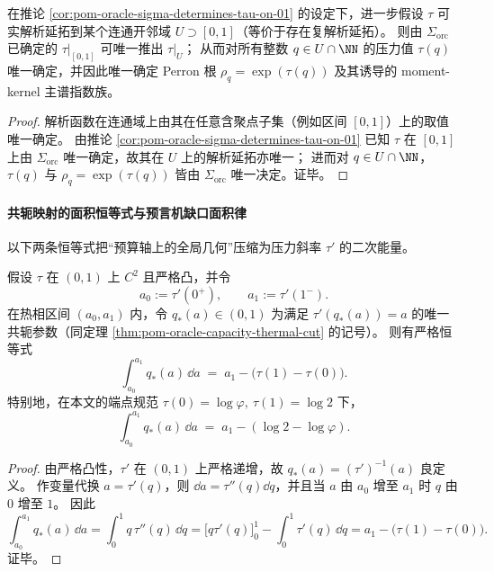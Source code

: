 \begin{corollary}[解析延拓的全谱决定性]\label{cor:pom-oracle-analytic-extension-all-spectrum}
在推论 \ref{cor:pom-oracle-sigma-determines-tau-on-01} 的设定下，进一步假设 \(\tau\) 可实解析延拓到某个连通开邻域 \(U\supset[0,1]\)（等价于存在复解析延拓）。
则由 \(\Sigma_{\mathrm{orc}}\) 已确定的 \(\tau|_{[0,1]}\) 可唯一推出 \(\tau|_{U}\)；
从而对所有整数 \(q\in U\cap\NN\) 的压力值 \(\tau(q)\) 唯一确定，并因此唯一确定 Perron 根 \(\rho_q=\exp(\tau(q))\) 及其诱导的 moment-kernel 主谱指数族。
\end{corollary}
\begin{proof}
解析函数在连通域上由其在任意含聚点子集（例如区间 \([0,1]\)）上的取值唯一确定。
由推论 \ref{cor:pom-oracle-sigma-determines-tau-on-01} 已知 \(\tau\) 在 \([0,1]\) 上由 \(\Sigma_{\mathrm{orc}}\) 唯一确定，故其在 \(U\) 上的解析延拓亦唯一；
进而对 \(q\in U\cap\NN\)，\(\tau(q)\) 与 \(\rho_q=\exp(\tau(q))\) 皆由 \(\Sigma_{\mathrm{orc}}\) 唯一决定。证毕。
\end{proof}

\paragraph{共轭映射的面积恒等式与预言机缺口面积律}
以下两条恒等式把“预算轴上的全局几何”压缩为压力斜率 \(\tau'\) 的二次能量。

\begin{theorem}\label{thm:pom-oracle-qstar-area-identity}
假设 \(\tau\) 在 \((0,1)\) 上 \(C^2\) 且严格凸，并令
\[
a_0:=\tau'(0^+),\qquad a_1:=\tau'(1^-).
\]
在热相区间 \((a_0,a_1)\) 内，令 \(q_*(a)\in(0,1)\) 为满足 \(\tau'(q_*(a))=a\) 的唯一共轭参数（同定理 \ref{thm:pom-oracle-capacity-thermal-cut} 的记号）。
则有严格恒等式
\[
\boxed{\;
\int_{a_0}^{a_1} q_*(a)\,\dd a \;=\; a_1-\bigl(\tau(1)-\tau(0)\bigr).\;}
\]
特别地，在本文的端点规范 \(\tau(0)=\log\varphi,\ \tau(1)=\log 2\) 下，
\[
\int_{a_0}^{a_1} q_*(a)\,\dd a \;=\; a_1-(\log 2-\log\varphi).
\]
\end{theorem}
\begin{proof}
由严格凸性，\(\tau'\) 在 \((0,1)\) 上严格递增，故 \(q_*(a)=(\tau')^{-1}(a)\) 良定义。
作变量代换 \(a=\tau'(q)\)，则 \(\dd a=\tau''(q)\dd q\)，并且当 \(a\) 由 \(a_0\) 增至 \(a_1\) 时 \(q\) 由 \(0\) 增至 \(1\)。
因此
\[
\int_{a_0}^{a_1} q_*(a)\,\dd a
=\int_{0}^{1} q\,\tau''(q)\,\dd q
=\bigl[q\tau'(q)\bigr]_{0}^{1}-\int_{0}^{1}\tau'(q)\,\dd q
=a_1-\bigl(\tau(1)-\tau(0)\bigr).
\]
证毕。
\end{proof}

